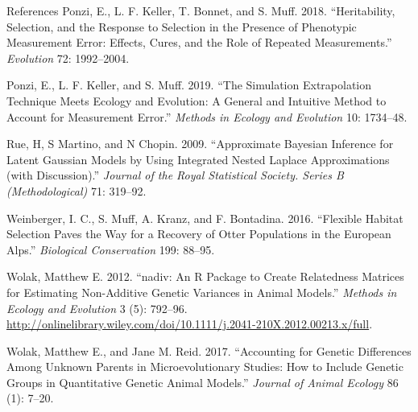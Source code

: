 \documentclass[10pt,ignorenonframetext,]{beamer}
\begin{document}
\begin{frame}{References}
\leavevmode\hypertarget{ref-ponzi.etal2018}{}%
Ponzi, E., L. F. Keller, T. Bonnet, and S. Muff. 2018. ``Heritability,
Selection, and the Response to Selection in the Presence of Phenotypic
Measurement Error: Effects, Cures, and the Role of Repeated
Measurements.'' \emph{Evolution} 72: 1992--2004.

\leavevmode\hypertarget{ref-ponzi.etal2019}{}%
Ponzi, E., L. F. Keller, and S. Muff. 2019. ``The Simulation
Extrapolation Technique Meets Ecology and Evolution: A General and
Intuitive Method to Account for Measurement Error.'' \emph{Methods in
Ecology and Evolution} 10: 1734--48.

\leavevmode\hypertarget{ref-rue.etal2009}{}%
Rue, H, S Martino, and N Chopin. 2009. ``Approximate Bayesian Inference
for Latent Gaussian Models by Using Integrated Nested Laplace
Approximations (with Discussion).'' \emph{Journal of the Royal
Statistical Society. Series B (Methodological)} 71: 319--92.

\leavevmode\hypertarget{ref-weinberger.etal2016}{}%
Weinberger, I. C., S. Muff, A. Kranz, and F. Bontadina. 2016. ``Flexible
Habitat Selection Paves the Way for a Recovery of Otter Populations in
the European Alps.'' \emph{Biological Conservation} 199: 88--95.

\leavevmode\hypertarget{ref-nadiv}{}%
Wolak, Matthew E. 2012. ``nadiv: An R Package to Create Relatedness
Matrices for Estimating Non-Additive Genetic Variances in Animal
Models.'' \emph{Methods in Ecology and Evolution} 3 (5): 792--96.
\url{http://onlinelibrary.wiley.com/doi/10.1111/j.2041-210X.2012.00213.x/full}.

\leavevmode\hypertarget{ref-wolak.reid2017}{}%
Wolak, Matthew E., and Jane M. Reid. 2017. ``Accounting for Genetic
Differences Among Unknown Parents in Microevolutionary Studies: How to
Include Genetic Groups in Quantitative Genetic Animal Models.''
\emph{Journal of Animal Ecology} 86 (1): 7--20.

\end{frame}
\end{document}
